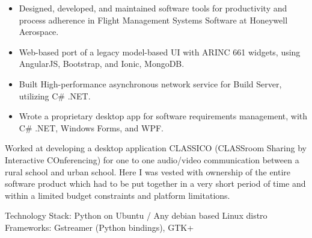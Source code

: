 \documentclass[10pt,a4paper,ragged2e,withhyper]{altacv}
\begin{document}
\begin{paracol}{2}
\begin{itemize}
  \item Designed, developed, and maintained software tools for productivity and process adherence in Flight Management Systems Software at Honeywell Aerospace.
  \item Web-based port of a legacy model-based UI with ARINC 661 widgets, using AngularJS, Bootstrap, and Ionic, MongoDB.
  \item Built High-performance asynchronous network service for Build Server, utilizing C\# .NET.
  \item Wrote a proprietary desktop app for software requirements management, with C\# .NET, Windows Forms, and WPF.
\end{itemize}

\divider

Worked at developing a desktop application CLASSICO (CLASSroom Sharing by Interactive COnferencing) for one to one audio/video communication between a rural school and urban school. Here I was vested with ownership of the entire software product which had to be put together in a very short period of time and within a limited budget constraints and platform limitations. 

Technology Stack: Python on Ubuntu / Any debian based Linux distro
Frameworks: Gstreamer (Python bindings), GTK+

\switchcolumn



\nocite{*}


\end{paracol}
\end{document}
